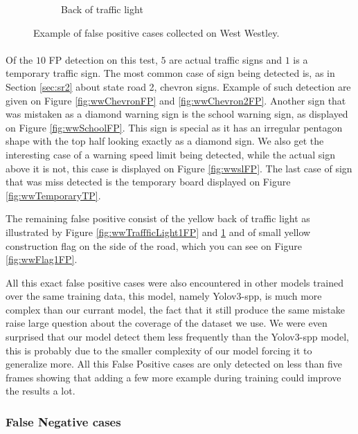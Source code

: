 \begin{figure}
\begin{center}
\begin{subfigure}[t]{.49\linewidth}
       \caption{Back of traffic light}
      \label{fig:wwTraffficLight2FP}
    \end{subfigure}
    \caption{Example of false positive cases collected on West Westley.}
    \label{fig:wwFPcases}
  \end{center}
\end{figure}

\paragraph{}
Of the $10$ FP detection on this test, $5$ are actual traffic signs and $1$ is a temporary traffic sign. The most common case of sign being detected is, as in Section \ref{sec:sr2} about state road 2, chevron signs. Example of such detection are given on Figure \ref{fig:wwChevronFP} and \ref{fig:wwChevron2FP}. Another sign that was mistaken as a diamond warning sign is the school warning sign, as displayed on Figure \ref{fig:wwSchoolFP}. This sign is special as it has an irregular pentagon shape with the top half looking exactly as a diamond sign. We also get the interesting case of a warning speed limit being detected, while the actual sign above it is not, this case is displayed on Figure \ref{fig:wwslFP}. The last case of sign that was miss detected is the temporary board displayed on Figure \ref{fig:wwTemporaryTP}.

The remaining false positive consist of the yellow back of traffic light as illustrated by Figure \ref{fig:wwTraffficLight1FP} and \ref{fig:wwTraffficLight2FP} and of small yellow construction flag on the side of the road, which you can see on Figure \ref{fig:wwFlag1FP}.

All this exact false positive cases were also encountered in other models trained over the same training data, this model, namely Yolov3-spp, is much more complex than our currant model, the fact that it still produce the same mistake raise large question about the coverage of the dataset we use. We were even surprised that our model detect them less frequently than the Yolov3-spp model, this is probably due to the smaller complexity of our model forcing it to generalize more. All this False Positive cases are only detected on less than five frames showing that adding a few more example during training could improve the results a lot.

\subsubsection{False Negative cases}
